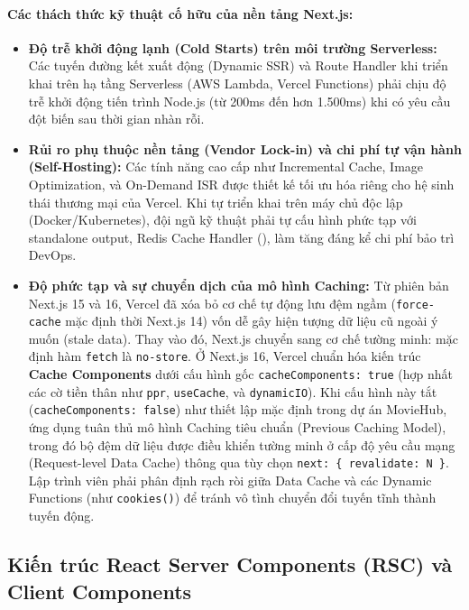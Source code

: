 \documentclass[12pt,a4paper]{extarticle}
\begin{document}
\paragraph*{Các thách thức kỹ thuật cố hữu của nền tảng Next.js:}
\begin{itemize}[noitemsep]
    \item \textbf{Độ trễ khởi động lạnh (Cold Starts) trên môi trường Serverless:} Các tuyến đường kết xuất động (Dynamic SSR) và Route Handler khi triển khai trên hạ tầng Serverless (AWS Lambda, Vercel Functions) phải chịu độ trễ khởi động tiến trình Node.js (từ 200ms đến hơn 1.500ms) khi có yêu cầu đột biến sau thời gian nhàn rỗi.
    \item \textbf{Rủi ro phụ thuộc nền tảng (Vendor Lock-in) và chi phí tự vận hành (Self-Hosting):} Các tính năng cao cấp như Incremental Cache, Image Optimization, và On-Demand ISR được thiết kế tối ưu hóa riêng cho hệ sinh thái thương mại của Vercel. Khi tự triển khai trên máy chủ độc lập (Docker/Kubernetes), đội ngũ kỹ thuật phải tự cấu hình phức tạp với standalone output, Redis Cache Handler (), làm tăng đáng kể chi phí bảo trì DevOps.
    \item \textbf{Độ phức tạp và sự chuyển dịch của mô hình Caching:} Từ phiên bản Next.js 15 và 16, Vercel đã xóa bỏ cơ chế tự động lưu đệm ngầm (\texttt{force-cache} mặc định thời Next.js 14) vốn dễ gây hiện tượng dữ liệu cũ ngoài ý muốn (stale data). Thay vào đó, Next.js chuyển sang cơ chế tường minh: mặc định hàm \texttt{fetch} là \texttt{no-store}. Ở Next.js 16, Vercel chuẩn hóa kiến trúc \textbf{Cache Components} dưới cấu hình gốc \texttt{cacheComponents: true} (hợp nhất các cờ tiền thân như \texttt{ppr}, \texttt{useCache}, và \texttt{dynamicIO}). Khi cấu hình này tắt (\texttt{cacheComponents: false}) như thiết lập mặc định trong dự án MovieHub, ứng dụng tuân thủ mô hình Caching tiêu chuẩn (Previous Caching Model), trong đó bộ đệm dữ liệu được điều khiển tường minh ở cấp độ yêu cầu mạng (Request-level Data Cache) thông qua tùy chọn \texttt{next: \{ revalidate: N \}}. Lập trình viên phải phân định rạch ròi giữa Data Cache và các Dynamic Functions (như \texttt{cookies()}) để tránh vô tình chuyển đổi tuyến tĩnh thành tuyến động.
\end{itemize}

\subsection{Kiến trúc React Server Components (RSC) và Client Components}
\end{document}
